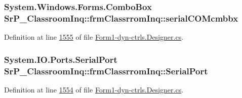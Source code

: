 \hypertarget{class_sr_p___classroom_inq_1_1frm_classrrom_inq_a78530d93c34ef9033ba7bd57c265782a}{
\subsubsection[{serial\-C\-O\-Mcmbbx}]{\setlength{\rightskip}{0pt plus 5cm}\-System.\-Windows.\-Forms.\-Combo\-Box {\bf \-Sr\-P\-\_\-\-Classroom\-Inq\-::frm\-Classrrom\-Inq\-::serial\-C\-O\-Mcmbbx}}}
\label{class_sr_p___classroom_inq_1_1frm_classrrom_inq_a78530d93c34ef9033ba7bd57c265782a}


\-Definition at line \hyperlink{_form1-dyn-ctrls_8_designer_8cs_source_l01555}{1555} of file \hyperlink{_form1-dyn-ctrls_8_designer_8cs_source}{\-Form1-\/dyn-\/ctrls.\-Designer.\-cs}.

\hypertarget{class_sr_p___classroom_inq_1_1frm_classrrom_inq_ae7bb088b1faefea06978daccf238ecd0}{
\subsubsection[{\-Serial\-Port}]{\setlength{\rightskip}{0pt plus 5cm}\-System.\-I\-O.\-Ports.\-Serial\-Port {\bf \-Sr\-P\-\_\-\-Classroom\-Inq\-::frm\-Classrrom\-Inq\-::\-Serial\-Port}}}
\label{class_sr_p___classroom_inq_1_1frm_classrrom_inq_ae7bb088b1faefea06978daccf238ecd0}


\-Definition at line \hyperlink{_form1-dyn-ctrls_8_designer_8cs_source_l01554}{1554} of file \hyperlink{_form1-dyn-ctrls_8_designer_8cs_source}{\-Form1-\/dyn-\/ctrls.\-Designer.\-cs}.

